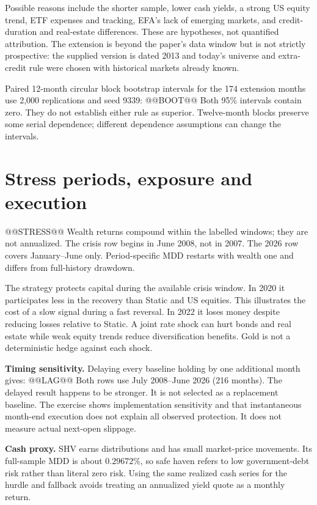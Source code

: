 \documentclass[11pt,letterpaper]{article}
\begin{document}
Possible reasons include the shorter sample, lower cash yields, a strong US equity trend, ETF expenses and tracking, EFA's lack of emerging markets, and credit-duration and real-estate differences. These are hypotheses, not quantified attribution. The extension is beyond the paper's data window but is not strictly prospective: the supplied version is dated 2013 and today's universe and extra-credit rule were chosen with historical markets already known.

Paired 12-month circular block bootstrap intervals for the 174 extension months use 2,000 replications and seed 9339:
@@BOOT@@
Both 95\% intervals contain zero. They do not establish either rule as superior. Twelve-month blocks preserve some serial dependence; different dependence assumptions can change the intervals.

\newpage
\section{Stress periods, exposure and execution}
@@STRESS@@
Wealth returns compound within the labelled windows; they are not annualized. The crisis row begins in June 2008, not in 2007. The 2026 row covers January--June only. Period-specific MDD restarts with wealth one and differs from full-history drawdown.

The strategy protects capital during the available crisis window. In 2020 it participates less in the recovery than Static and US equities. This illustrates the cost of a slow signal during a fast reversal. In 2022 it loses money despite reducing losses relative to Static. A joint rate shock can hurt bonds and real estate while weak equity trends reduce diversification benefits. Gold is not a deterministic hedge against each shock.

\textbf{Timing sensitivity.} Delaying every baseline holding by one additional month gives:
@@LAG@@
Both rows use July 2008--June 2026 (216 months). The delayed result happens to be stronger. It is not selected as a replacement baseline. The exercise shows implementation sensitivity and that instantaneous month-end execution does not explain all observed protection. It does not measure actual next-open slippage.

\textbf{Cash proxy.} SHV earns distributions and has small market-price movements. Its full-sample MDD is about \(0.29672\%\), so safe haven refers to low government-debt risk rather than literal zero risk. Using the same realized cash series for the hurdle and fallback avoids treating an annualized yield quote as a monthly return.
\end{document}
